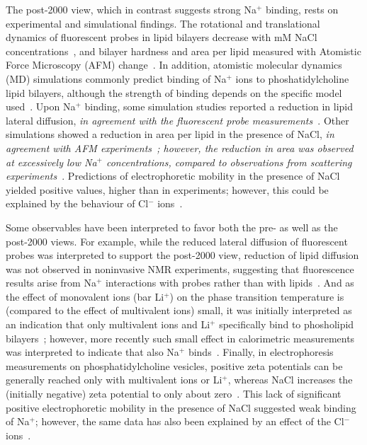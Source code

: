 \documentclass[pre,aps,floatfix,authordate1-4,twocolumn]{revtex4-1}
\begin{document}
The post-2000 view, which in contrast suggests strong Na$^{+}$ binding, rests on experimental and simulational findings.
The rotational and translational dynamics of fluorescent probes in lipid bilayers decrease with mM NaCl concentrations~\cite{bockmann03,vacha09a,harb13}, and bilayer hardness and area per lipid measured with Atomistic Force Microscopy (AFM) change~\cite{manyes05,manyes06,fukuma07,ferber11,morata12}.
In addition, atomistic molecular dynamics (MD) simulations
commonly predict binding of Na${^+}$ ions 
to phoshatidylcholine lipid bilayers, although the strength of binding depends on the specific model used~\cite{bockmann03,bockmann04,sachs04,berkowitz06,cordomi08,cordomi09,valley11,berkowitz12}. 
Upon Na$^+$ binding, some simulation studies reported a reduction in lipid lateral diffusion, 
{\it in agreement with the fluorescent probe measurements~\cite{bockmann03,vacha09a,harb13}}.
Other simulations showed a reduction in area per lipid in the presence of NaCl, 
{\it in agreement with AFM experiments~\cite{manyes05,manyes06,fukuma07,ferber11,morata12};
however, the reduction in area was observed at excessively low Na$^+$ concentrations, 
compared to observations from scattering experiments~\cite{pabst07}}.
Predictions of electrophoretic mobility in the presence of NaCl yielded positive values, higher than in experiments; 
however, this could be explained by the behaviour of Cl$^-$ ions~\cite{berkowitz06,knecht13}.

Some observables have been interpreted to favor both the pre- as well as the post-2000 views.
For example, while the reduced lateral diffusion of fluorescent probes was interpreted to support the post-2000 view,
reduction of lipid diffusion was not observed in noninvasive NMR experiments,
suggesting that fluorescence results arise from Na$^{+}$ interactions with probes rather than with lipids~\cite{filippov09}.
And  %
as the effect of monovalent ions (bar Li$^+$)  on the phase transition temperature is 
(compared to the effect of multivalent ions) small, it was initially interpreted %
as an indication that only multivalent ions and Li$^+$ specifically bind to phosholipid bilayers~\cite{cevc90}; 
however, more recently such small effect in calorimetric measurements was interpreted to indicate that 
also Na$^+$ binds~\cite{bockmann03,klasczyk10}.
Finally, in electrophoresis measurements on phosphatidylcholine vesicles, 
positive zeta potentials can be generally reached only with multivalent ions or Li$^+$,
whereas NaCl increases the (initially negative) zeta potential to only about zero~\cite{eisenberg79,tatulian87,manyes05,manyes06,klasczyk10}. 
This lack of significant positive electrophoretic mobility in the presence of NaCl suggested weak binding of Na$^+$; 
however, the same data has also been explained by an effect of the Cl$^-$ ions~\cite{berkowitz06,knecht13}.
\end{document}
